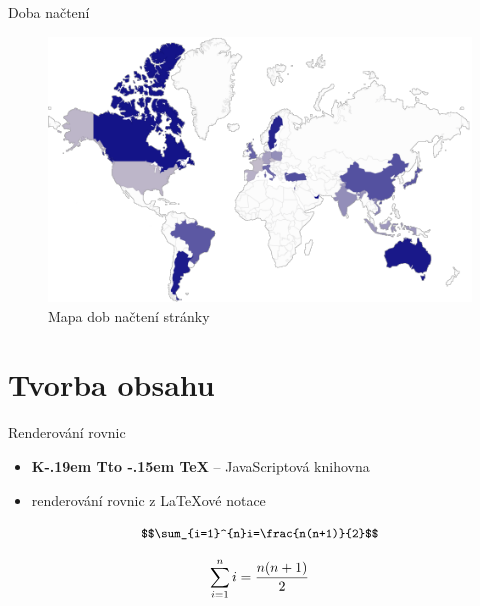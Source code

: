 \documentclass[14pt, hyperref={unicode}]{beamer}
\makeatletter
\DeclareRobustCommand{\KaTeX}{%
  K\kern -.19em
  {\sbox \z@ T\vbox to\ht \z@ {\hbox{%
  \check@mathfonts
  \fontsize\sf@size\z@
  \selectfont A}%
  \vss}%
}\kern -.15em
\TeX}
\makeatother
\begin{document}
  \begin{frame}{Doba načtení}
    \begin{figure}[H]
      \includegraphics[width=\textwidth,height=0.7\textheight,keepaspectratio]{map.png}
      \caption{Mapa dob načtení stránky}
    \end{figure}
  \end{frame}

  \section{Tvorba obsahu}

  \begin{frame}[fragile]{Renderování rovnic}
    \begin{itemize}
      \item<+-> {\mathfont\textbf{\KaTeX}} -- JavaScriptová knihovna
      \item<+-> renderování rovnic z {\mathfont\LaTeX}ové notace
    \end{itemize}
    
    \onslide<+->
    \begin{equation}
      \small
      \verb|$$\sum_{i=1}^{n}i=\frac{n(n+1)}{2}$$|
    \end{equation}

    \onslide<+->
    \begin{equation}
      \small
      \sum_{i=1}^{n} i = \frac{n(n+1)}{2}
    \end{equation}
  \end{frame}
\end{document}
